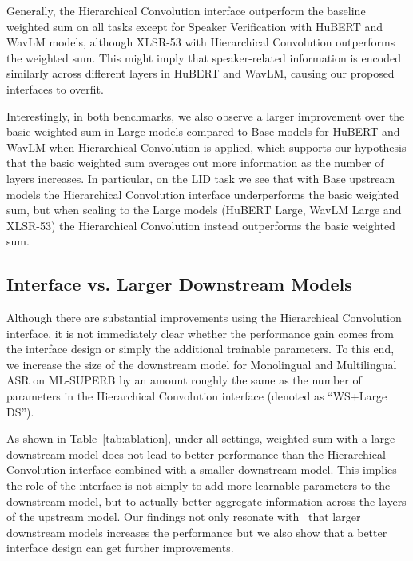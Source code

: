 Generally, the Hierarchical Convolution interface
outperform the baseline weighted sum on all tasks except for Speaker Verification with HuBERT and WavLM models, although XLSR-53 with Hierarchical Convolution outperforms the weighted sum.
This might imply that speaker-related information is encoded similarly across different layers in HuBERT and WavLM, causing our proposed interfaces to overfit.

Interestingly, in both benchmarks, we also observe a larger improvement over the basic weighted sum in Large models compared to Base models for HuBERT and WavLM when Hierarchical Convolution is applied, which supports our hypothesis that the basic weighted sum averages out more information as the number of layers increases.
In particular, on the LID task we see that with Base upstream models the Hierarchical Convolution interface underperforms the basic weighted sum, but when scaling to the Large models (HuBERT Large, WavLM Large and XLSR-53) the Hierarchical Convolution instead outperforms the basic weighted sum.


\subsection{Interface vs. Larger Downstream Models}




Although there are substantial improvements using the Hierarchical Convolution interface, it is not immediately clear whether the performance gain comes from the interface design or simply the additional trainable parameters.
To this end, we increase the size of the downstream model for Monolingual and Multilingual ASR on ML-SUPERB by an amount roughly the same as the number of parameters in the Hierarchical Convolution interface (denoted as ``WS+Large DS'').

As shown in Table~\ref{tab:ablation}, under all settings, weighted sum with a large downstream model does not lead to better performance than the Hierarchical Convolution interface combined with a smaller downstream model.
This implies the role of the interface is not simply to add more learnable parameters to the downstream model, but to actually better aggregate information across the layers of the upstream model.
Our findings not only resonate with~\cite{zaiem23b_interspeech} that larger downstream models increases the performance but we also show that a better interface design can get further improvements.


